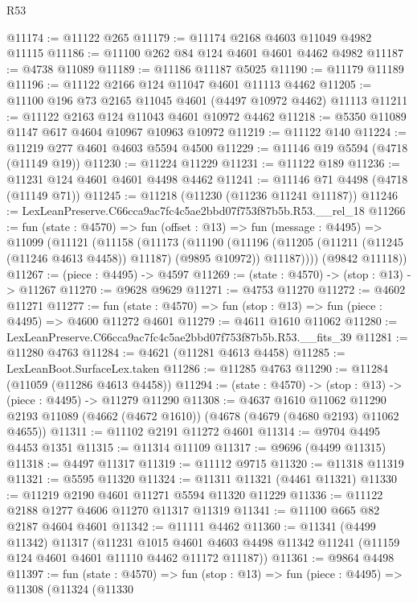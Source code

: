 \begin{lexlean}{R53}
\begin{coremodule}
@11174 := @11122 @265
@11179 := @11174 @2168 @4603 @11049 @4982 @11115
@11186 := @11100 @262 @84 @124 @4601 @4601 @4462 @4982
@11187 := @4738 @11089
@11189 := @11186 @11187 @5025
@11190 := @11179 @11189
@11196 := @11122 @2166 @124 @11047 @4601 @11113 @4462
@11205 := @11100 @196 @73 @2165 @11045 @4601 (@4497 @10972 @4462) @11113
@11211 := @11122 @2163 @124 @11043 @4601 @10972 @4462
@11218 := @5350 @11089 @1147 @617 @4604 @10967 @10963 @10972
@11219 := @11122 @140
@11224 := @11219 @277 @4601 @4603 @5594 @4500
@11229 := @11146 @19 @5594 (@4718 (@11149 @19))
@11230 := @11224 @11229
@11231 := @11122 @189
@11236 := @11231 @124 @4601 @4601 @4498 @4462
@11241 := @11146 @71 @4498 (@4718 (@11149 @71))
@11245 := @11218 (@11230 (@11236 @11241 @11187))
@11246 := LexLeanPreserve.C66cca9ac7fc4c5ae2bbd07f753f87b5b.R53.__rel_18
@11266 := fun (state : @4570) =>
  fun (offset : @13) =>
  fun (message : @4495) =>
  @11099
    (@11121
      (@11158
        (@11173
          (@11190
            (@11196 (@11205 (@11211 (@11245 (@11246 @4613 @4458)) @11187) (@9895 @10972)) @11187))))
      (@9842 @11118))
@11267 := (piece : @4495) -> @4597
@11269 := (state : @4570) -> (stop : @13) -> @11267
@11270 := @9628 @9629
@11271 := @4753 @11270
@11272 := @4602 @11271
@11277 := fun (state : @4570) => fun (stop : @13) => fun (piece : @4495) => @4600 @11272 @4601
@11279 := @4611 @1610 @11062
@11280 := LexLeanPreserve.C66cca9ac7fc4c5ae2bbd07f753f87b5b.R53.__fits_39
@11281 := @11280 @4763
@11284 := @4621 (@11281 @4613 @4458)
@11285 := LexLeanBoot.SurfaceLex.taken
@11286 := @11285 @4763
@11290 := @11284 (@11059 (@11286 @4613 @4458))
@11294 := (state : @4570) -> (stop : @13) -> (piece : @4495) -> @11279 @11290
@11308 := @4637
    @1610
    @11062
    @11290
    @2193
    @11089
    (@4662 (@4672 @1610))
    (@4678 (@4679 (@4680 @2193) @11062 @4655))
@11311 := @11102 @2191 @11272 @4601
@11314 := @9704 @4495 @4453 @1351
@11315 := @11314 @11109
@11317 := @9696 (@4499 @11315)
@11318 := @4497 @11317
@11319 := @11112 @9715
@11320 := @11318 @11319
@11321 := @5595 @11320
@11324 := @11311 @11321 (@4461 @11321)
@11330 := @11219 @2190 @4601 @11271 @5594 @11320 @11229
@11336 := @11122 @2188 @1277 @4606 @11270 @11317 @11319
@11341 := @11100 @665 @82 @2187 @4604 @4601
@11342 := @11111 @4462
@11360 := @11341
    (@4499 @11342)
    @11317
    (@11231
      @1015
      @4601
      @4603
      @4498
      @11342
      @11241
      (@11159 @124 @4601 @4601 @11110 @4462 @11172 @11187))
@11361 := @9864 @4498
@11397 := fun (state : @4570) =>
  fun (stop : @13) =>
  fun (piece : @4495) =>
  @11308
    (@11324
      (@11330

\end{coremodule}
\end{lexlean}
